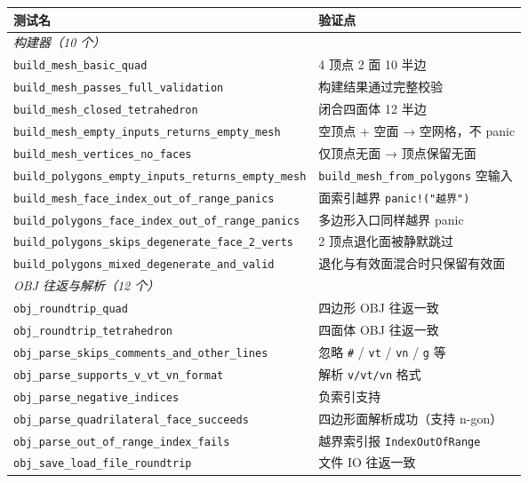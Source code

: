 \documentclass[11pt,a4paper]{article}
\begin{document}
\begin{longtable}{@{}ll@{}}
  \toprule
  \textbf{测试名} & \textbf{验证点} \\
  \midrule
  \endhead
  \multicolumn{2}{l}{\textit{构建器（10 个）}} \\
  \texttt{build\_mesh\_basic\_quad}                  & 4 顶点 2 面 10 半边 \\
  \texttt{build\_mesh\_passes\_full\_validation}     & 构建结果通过完整校验 \\
  \texttt{build\_mesh\_closed\_tetrahedron}          & 闭合四面体 12 半边 \\
  \texttt{build\_mesh\_empty\_inputs\_returns\_empty\_mesh} & 空顶点 + 空面 → 空网格，不 panic \\
  \texttt{build\_mesh\_vertices\_no\_faces}          & 仅顶点无面 → 顶点保留无面 \\
  \texttt{build\_polygons\_empty\_inputs\_returns\_empty\_mesh} & \texttt{build\_mesh\_from\_polygons} 空输入 \\
  \texttt{build\_mesh\_face\_index\_out\_of\_range\_panics} & 面索引越界 \texttt{panic!("越界")} \\
  \texttt{build\_polygons\_face\_index\_out\_of\_range\_panics} & 多边形入口同样越界 panic \\
  \texttt{build\_polygons\_skips\_degenerate\_face\_2\_verts} & 2 顶点退化面被静默跳过 \\
  \texttt{build\_polygons\_mixed\_degenerate\_and\_valid} & 退化与有效面混合时只保留有效面 \\
  \midrule
  \multicolumn{2}{l}{\textit{OBJ 往返与解析（12 个）}} \\
  \texttt{obj\_roundtrip\_quad}                      & 四边形 OBJ 往返一致 \\
  \texttt{obj\_roundtrip\_tetrahedron}               & 四面体 OBJ 往返一致 \\
  \texttt{obj\_parse\_skips\_comments\_and\_other\_lines} & 忽略 \texttt{\#} / \texttt{vt} / \texttt{vn} / \texttt{g} 等 \\
  \texttt{obj\_parse\_supports\_v\_vt\_vn\_format}   & 解析 \texttt{v/vt/vn} 格式 \\
  \texttt{obj\_parse\_negative\_indices}             & 负索引支持 \\
  \texttt{obj\_parse\_quadrilateral\_face\_succeeds} & 四边形面解析成功（支持 n-gon） \\
  \texttt{obj\_parse\_out\_of\_range\_index\_fails}  & 越界索引报 \texttt{IndexOutOfRange} \\
  \texttt{obj\_save\_load\_file\_roundtrip}          & 文件 IO 往返一致 \\

\end{longtable}
\end{document}
